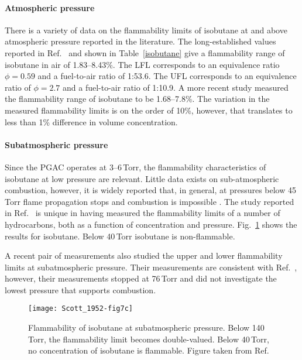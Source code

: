 \paragraph{Atmospheric pressure}
There is a variety of data on the flammability limits of isobutane at and above atmospheric pressure reported in the literature.  The long-established values reported in Ref.~\cite{Jones_1947} and shown in Table~\ref{isobutane} give a flammability range of isobutane in air of 1.83--8.43\%.  The LFL corresponds to an equivalence ratio $\phi=0.59$ %
and a fuel-to-air ratio of 1:53.6.  The UFL corresponds to an equivalence ratio of $\phi=2.7$ %
and a fuel-to-air ratio of 1:10.9.
A more recent study \cite{Kondo_2007} measured the flammability range of isobutane to be 1.68--7.8\%.  The variation in the measured flammability limits is on the order of 10\%, however, that translates to less than 1\% difference in volume concentration.

\paragraph{Subatmospheric pressure}
Since the PGAC operates at 3--6\,Torr, the flammability characteristics of isobutane at low pressure are relevant.  Little data exists on sub-atmospheric combustion, however, it is widely reported that, in general, at pressures below 45\,Torr flame propagation stops and combustion is impossible \cite{hazard}. %
The study reported in Ref.~\cite{Scott_1952} is unique in having measured the flammability limits of a number of hydrocarbons, both as a function of concentration and pressure. Fig.~\ref{lowpres} shows the results for isobutane.  Below 40\,Torr isobutane is non-flammable.

A recent pair of measurements also studied the upper \cite{Le_2012} and lower \cite{Le_2013} flammability limits at subatmospheric pressure.  Their measurements are consistent with Ref.~\cite{Scott_1952}, however, their measurements stopped at 76\,Torr and did not investigate the lowest pressure that supports combustion. 

\begin{figure}[t]%
\centering  
\texttt{[image: Scott\_1952-fig7c]}%
\caption{Flammability of isobutane at subatmospheric pressure.
Below 140\,Torr, the flammability limit becomes double-valued.  Below 40\,Torr, no concentration of isobutane is flammable.  Figure taken from Ref.~\cite[Fig.~7]{Scott_1952}}%
\label{lowpres}%
\end{figure}

